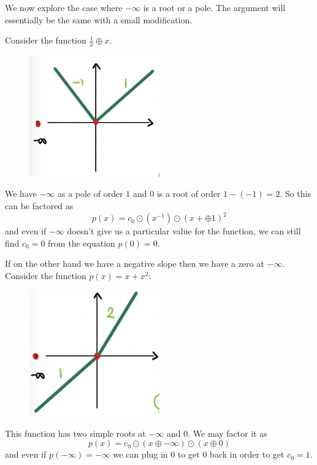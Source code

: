 \documentclass[12pt]{memoir}
\begin{document}
\begin{Ex}
    We now explore the case where $-\infty$ is a root or a pole. The argument will essentially be the same with a small modification.\par 
    Consider the function $\frac{1}{x}\oplus x$.
    \begin{figure}[h!]
        \centering
        \includegraphics[width=0.5\textwidth]{figs/fig4-2RootAndPoleProof.png}
        \label{fig:4.2-RootAndPoleProof}
    \end{figure}
    We have $-\infty$ as a pole of order $1$ and $0$ is a root of order $1-(-1)=2$. So this can be factored as 
    $$p(x)=c_0\odot(x^{-1})\odot(x+\oplus 1)^2$$
    and even if $-\infty$ doesn't give us a particular value for the function, we can still find $c_0=0$ from the equation $p(0)=0$.\par 
    If on the other hand we have a negative slope then we have a zero at $-\infty$. Consider the function $p(x)=x+x^2$:
    \begin{figure}[h!]
        \centering
        \includegraphics[width=0.5\textwidth]{figs/fig4-3RootsForProof.png}
        \label{fig:4.3-RootsForProof}
    \end{figure}
    This function has two simple roots at $-\infty$ and $0$. We may factor it as 
    $$p(x)=c_0\odot(x\oplus-\infty)\odot(x\oplus 0)$$
    and even if $p(-\infty)=-\infty$ we can plug in $0$ to get $0$ back in order to get $c_0=1$.
\end{Ex}
\end{document}

